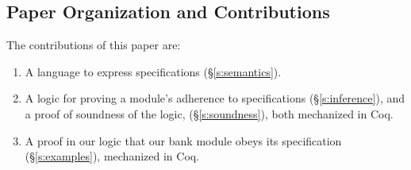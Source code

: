 

\subsection{Paper Organization and Contributions}


%
The contributions of this paper are:\begin{enumerate}
 \item
A language to
express \Nec specifications (\S\ref{s:semantics}).

 \item
A logic for proving a module's adherence to 
 \Nec specifications (\S\ref{s:inference}), and a proof of soundness of the logic, (\S\ref{s:soundness}),
both mechanized in Coq. 
 \item
A proof in our logic %
  that our bank module obeys its \Nec specification (\S\ref{s:examples}),  mechanized in Coq.
\end{enumerate}



